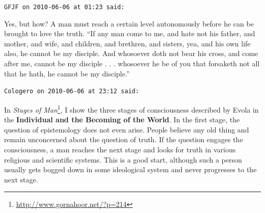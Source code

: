 \begin{footnotesize}
\begin{sffamily}
\texttt{GFJF on 2010-06-06 at 01:23 said:}

Yes, but how? A man must reach a certain level autonomously before he can be brought to love the truth. ``If any man come to me, and hate not his father, and mother, and wife, and children, and brethren, and sisters, yea, and his own life also, he cannot be my disciple. And whosoever doth not bear his cross, and come after me, cannot be my disciple . . . whosoever he be of you that forsaketh not all that he hath, he cannot be my disciple.''

\hfill

\texttt{Cologero on 2010-06-06 at 23:12 said:}

In \textit{Stages of Man}\footnote{\url{http://www.gornahoor.net/?p=214}}, I show the three stages of consciousness described by Evola in the \textbf{Individual and the Becoming of the World}. In the first stage, the question of epistemology does not even arise. People believe any old thing and remain unconcerned about the question of truth. If the question engages the consciousness, a man reaches the next stage and looks for truth in various religious and scientific systems. This is a good start, although such a person usually gets bogged down in some ideological system and never progresses to the next stage.

\end{sffamily}
\end{footnotesize}

